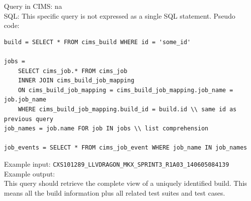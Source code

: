 \label{q:getallbuilddata}
Query in CIMS: na \\
SQL: This specific query is not expressed as a single SQL statement. Pseudo code:
\begin{verbatim}
build = SELECT * FROM cims_build WHERE id = 'some_id'

jobs = 
    SELECT cims_job.* FROM cims_job
    INNER JOIN cims_build_job_mapping
    ON cims_build_job_mapping = cims_build_job_mapping.job_name = job.job_name
    WHERE cims_build_job_mapping.build_id = build.id \\ same id as previous query
job_names = job.name FOR job IN jobs \\ list comprehension

job_events = SELECT * FROM cims_job_event WHERE job_name IN job_names
\end{verbatim}
Example input: {\tt CXS101289\_LLVDRAGON\_MKX\_SPRINT3\_R1A03\_140605084139 } \\
Example output: \\
This query should retrieve the complete view of a uniquely identified build. This means all the build information plus all related test suites and test cases.



%
%
